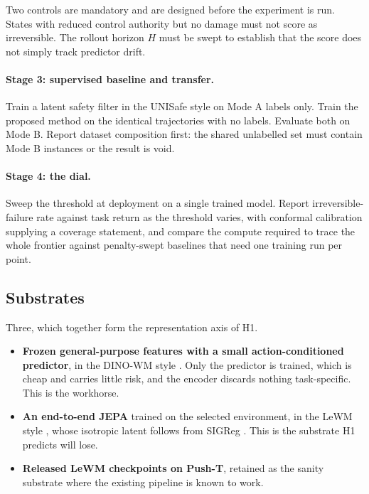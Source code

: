\documentclass[11pt,a4paper]{article}
\begin{document}
Two controls are mandatory and are designed before the experiment is run. States with reduced
control authority but no damage must not score as irreversible. The rollout horizon $H$ must
be swept to establish that the score does not simply track predictor drift.

\paragraph{Stage 3: supervised baseline and transfer.} Train a latent safety filter in the
UNISafe style \parencite{seo2025unisafe} on Mode A labels only. Train the proposed method on
the identical trajectories with no labels. Evaluate both on Mode B. Report dataset
composition first: the shared unlabelled set must contain Mode B instances or the result is
void.

\paragraph{Stage 4: the dial.} Sweep the threshold at deployment on a single trained model.
Report irreversible-failure rate against task return as the threshold varies, with conformal
calibration supplying a coverage statement, and compare the compute required to trace the
whole frontier against penalty-swept baselines that need one training run per point.

\subsection{Substrates}

Three, which together form the representation axis of H1.

\begin{itemize}
  \item \textbf{Frozen general-purpose features with a small action-conditioned predictor}, in
    the DINO-WM style \parencite{zhou2024dinowm}. Only the predictor is trained, which is
    cheap and carries little risk, and the encoder discards nothing task-specific. This is
    the workhorse.
  \item \textbf{An end-to-end JEPA} trained on the selected environment, in the LeWM style
    \parencite{maes2026lewm}, whose isotropic latent follows from SIGReg
    \parencite{balestriero2025lejepa}. This is the substrate H1 predicts will lose.
  \item \textbf{Released LeWM checkpoints on Push-T}, retained as the sanity substrate where
    the existing pipeline is known to work.
\end{itemize}
\end{document}
